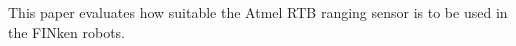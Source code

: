 
This paper evaluates how suitable the Atmel RTB ranging sensor is to be used in the FINken robots.
